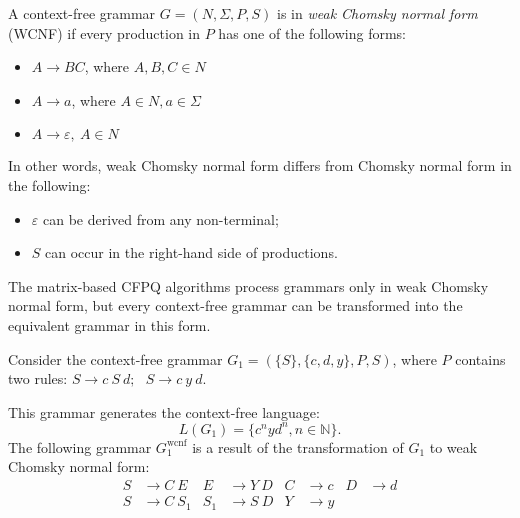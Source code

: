 
\begin{definition} A context-free grammar $G = (N, \Sigma, P, S)$ is in \emph{weak Chomsky normal form} (WCNF) if every production in $P$ has one of the following forms:
    \begin{itemize}
        \item $A \rightarrow BC$, where $A, B, C \in N$
        \item  $A \rightarrow a$, where $A \in N, a \in \Sigma$
        \item $A \rightarrow \varepsilon,~A \in N$
    \end{itemize}
\end{definition}

In other words, weak Chomsky normal form differs from Chomsky normal form in the following:
\begin{itemize}
    \item $\varepsilon$ can be derived from any non-terminal;
    \item $S$ can occur in the right-hand side of productions.
\end{itemize}

The matrix-based CFPQ algorithms process grammars only in weak Chomsky normal form, but every context-free grammar can be transformed into the equivalent grammar in this form.

Consider the context-free grammar $G_1=(\{S\},\{c, d, y\}, P, S)$, where $P$ contains two rules:
$S \rightarrow c \ S \ d; \ \ \ 
S \rightarrow c \ y \ d
$.%

This grammar generates the context-free language: $$L(G_1) = \{c^nyd^n, n \in \mathbb{N}\}.$$
The following grammar $G_1^{\text{wcnf}}$ is a result of the transformation of $G_1$ to weak Chomsky normal form:
\begin{align*}
S& \to C \ E   & E& \to Y \ D   & C& \to c &D& \to d   \\
S& \to C \ S_1 & S_1& \to S \ D & Y& \to y &&  \\
\end{align*}


